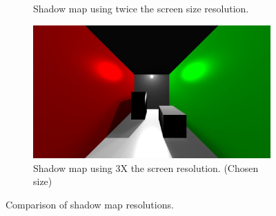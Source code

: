 \begin{figure}
\begin{subfigure}[b]{0.5\textwidth}
        		\caption{Shadow map using twice the screen size resolution.}
        \end{subfigure}
        \centering
        \begin{subfigure}[b]{0.5\textwidth}
        		\includegraphics[width=\textwidth]{AltResults/3SM.jpg}
        		\caption{Shadow map using 3X the screen resolution. (Chosen size)}
        \end{subfigure}
        \caption{Comparison of shadow map resolutions.}\label{fig:SMsizes}
\end{figure}

